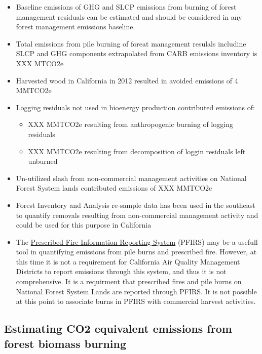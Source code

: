 \documentclass[a4paper]{article}
\begin{document}
\begin{itemize}
\item Baseline emissions of GHG and SLCP emissions from burning of forest
management residuals can be estimated and should be considered in
any forest management emissions baseline.

\item Total emissions from pile burning of foreat management resulals
includine SLCP and GHG components extrapolated from CARB emissions
inventory is XXX MTCO2e

\item Harvested wood in California in 2012 resulted in avoided emissions of
4 MMTCO2e

\item Logging residuals not used in bioenergy production contributed
emissions of:
\begin{itemize}
\item XXX MMTCO2e resulting from anthropogenic burning of logging residuals

\item XXX MMTCO2e resulting from decomposition of loggin residuals left
unburned
\end{itemize}

\item Un-utilized slash from non-commercial management activities on
National Forest System lands contributed emissions of XXX MMTCO2e

\item Forest Inventory and Analysis re-sample data has been used in the
southeast to quantify removals resulting from non-commercial
management activity and could be used for this purpose in California

\item The \href{https://ssl.arb.ca.gov/pfirs/}{Prescribed Fire Information Reporting System} (PFIRS) may be a usefull tool in quantifying
emissions from pile burns and prescribed fire. However, at this time
it is not a requirement for California Air Quality Management
Districts to report emissions through this system, and thus it is not
comprehensive. It is a requirment that prescribed fires and pile
burns on National Forest System Lands are reported through PFIRS. It
is not possible at this point to associate burns in PFIRS with
commercial harvest activities.
\end{itemize}


\subsection{Estimating CO2 equivalent emissions from forest biomass burning}
\label{sec:orgheadline4}
\end{document}

